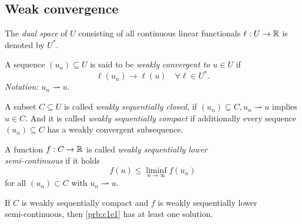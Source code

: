 \documentclass[../skript.tex]{subfiles}
\begin{document}
\subsection{Weak convergence}
The \emph{dual space} of $U$ consisting of all continuous linear functionals $\ell : U \to \mathbb{R}$ is denoted by $U^*$.
\begin{definition} %
\label{def:c1e2}
A sequence $(u_n) \subseteq U$ is said to be \emph{weakly convergent to $u \in U$} if
\[
	\ell(u_n) \to \ell(u) \quad \forall \ell \in U^*.
\]
\emph{Notation:} $u_n \rightharpoonup u$.
\end{definition}
\begin{definition} %
\label{def:c1e3}
A subset $C \subseteq U$ is called \emph{weakly sequentially closed}, if $(u_n) \subseteq C, u_n \rightharpoonup u$ implies $u \in C$. And it is called \emph{weakly sequentially compact} if additionally every sequence $(u_n) \subseteq C$ has a weakly convergent subsequence.
\end{definition}
\begin{definition} %
\label{def:c1e4}
A function $f : C \to \mathbb{R}$ is called \emph{weakly sequentially lower \\ semi-continuous} if it holds
\[
	f(u) \leq \liminf_{n \to \infty} f(u_n)
\]
for all $(u_n) \subset C$ with $u_n \rightharpoonup u$.
\end{definition}
\begin{theorem} %
\label{thm:c1e5}
If $C$ is weakly sequentially compact and $f$ is weakly sequentially lower \\ semi-continuous, then \cref{prb:c1e1} has at least one solution.
\end{theorem}
\end{document}
